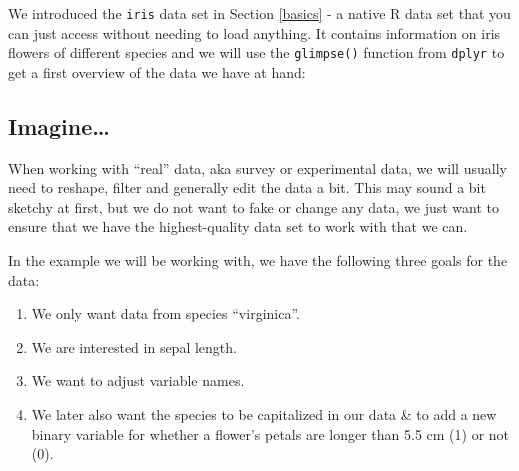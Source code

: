 \documentclass[
]{book}
\newenvironment{Shaded}{\begin{snugshade}}{\end{snugshade}}
\newcommand{\CommentTok}[1]{\textcolor[rgb]{0.56,0.35,0.01}{\textit{#1}}}
\newcommand{\FunctionTok}[1]{\textcolor[rgb]{0.13,0.29,0.53}{\textbf{#1}}}
\newcommand{\NormalTok}[1]{#1}
\newcommand{\SpecialCharTok}[1]{\textcolor[rgb]{0.81,0.36,0.00}{\textbf{#1}}}
\providecommand{\tightlist}{%
  \setlength{\itemsep}{0pt}\setlength{\parskip}{0pt}}
\begin{document}
We introduced the \texttt{iris} data set in Section \ref{basics} - a native R data set that you can just access without needing to load anything.
It contains information on iris flowers of different species and we will use the \texttt{glimpse()} function from \texttt{dplyr} to get a first overview of the data we have at hand:

\begin{Shaded}
\end{Shaded}

\subsection*{Imagine\ldots{}}\label{imagine}

When working with ``real'' data, aka survey or experimental data, we will usually need to reshape, filter and generally edit the data a bit.
This may sound a bit sketchy at first, but we do not want to fake or change any data, we just want to ensure that we have the highest-quality data set to work with that we can.

In the example we will be working with, we have the following three goals for the data:

\begin{enumerate}
\def\labelenumi{\arabic{enumi}.}
\tightlist
\item
  We only want data from species ``virginica''.
\item
  We are interested in sepal length.
\item
  We want to adjust variable names.
\item
  We later also want the species to be capitalized in our data \& to add a new binary variable for whether a flower's petals are longer than 5.5 cm (1) or not (0).
\end{enumerate}
\end{document}
